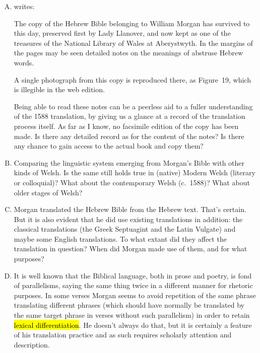 \begin{enumerate}[A.]
	\item \cite{morgan.p:1988:beibl} writes:
		\begin{changemargin}{1cm}{0cm}
			\begin{bilingquote}
				\transline
				{}
				{The copy of the Hebrew Bible belonging to William Morgan has survived to this day, preserved first by Lady Llanover, and now kept as one of the treasures of the National Library of Wales at Aberystwyth. In the margins of the pages may be seen detailed notes on the meanings of abstruse Hebrew words.}
			\end{bilingquote}
		\end{changemargin}
		\vspace{-0.5cm}
		A single photograph from this copy is reproduced there, as Figure~19, which is illegible in the web edition.

		Being able to read these notes can be a peerless aid to a fuller understanding of the 1588 translation, by giving us a glance at a record of the translation process itself. As far as I know, no facsimile edition of the copy has been made. Is there any detailed record as for the content of the notes? Is there any chance to gain access to the actual book and copy them?

	\item Comparing the linguistic system emerging from Morgan’s Bible with other kinds of Welsh. Is the same still holds true in (native) Modern Welsh (literary or colloquial)? What about the contemporary Welsh (c.~1588)? What about older stages of Welsh?

	\item Morgan translated the Hebrew Bible from the Hebrew text. That’s certain. But it is also evident that he did use existing translations in addition: the classical translations (the Greek Septuagint and the Latin Vulgate) and maybe some English translations. To what extant did they affect the translation in question? When did Morgan made use of them, and for what purposes?

	\item It is well known that the Biblical language, both in prose and poetry, is fond of parallelisms, saying the same thing twice in a different manner for rhetoric purposes. In some verses Morgan seems to avoid repetition of the same phrase translating different phrases (which should have normally be translated by the same target phrase in verses without such parallelism) in order to retain \hl{lexical differentiation}. He doesn’t always do that, but it is certainly a feature of his translation practice and as such requires scholarly attention and description. 


\end{enumerate}
